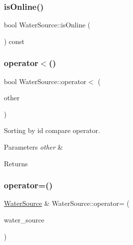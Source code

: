 \mbox{\label{classWaterSource_a130fd661ff31c53115cca23e4e2f210a}} 
\subsubsection{\texorpdfstring{is\+Online()}{isOnline()}}
{\footnotesize\ttfamily bool Water\+Source\+::is\+Online (\begin{DoxyParamCaption}{ }\end{DoxyParamCaption}) const}

\mbox{\label{classWaterSource_accb044cc78f9a444ca18bf7283b5b596}} 
\subsubsection{\texorpdfstring{operator$<$()}{operator<()}}
{\footnotesize\ttfamily bool Water\+Source\+::operator$<$ (\begin{DoxyParamCaption}\item[{const \mbox{\hyperlink{classWaterSource}{Water\+Source}} $\ast$}]{other }\end{DoxyParamCaption})}

Sorting by id compare operator. 
\begin{DoxyParams}{Parameters}
{\em other} & \\
\hline
\end{DoxyParams}
\begin{DoxyReturn}{Returns}

\end{DoxyReturn}
\mbox{\label{classWaterSource_aafdaafb023a35186ae01d213665b5e27}} 
\subsubsection{\texorpdfstring{operator=()}{operator=()}}
{\footnotesize\ttfamily \mbox{\hyperlink{classWaterSource}{Water\+Source}} \& Water\+Source\+::operator= (\begin{DoxyParamCaption}\item[{const \mbox{\hyperlink{classWaterSource}{Water\+Source}} \&}]{water\+\_\+source }\end{DoxyParamCaption})}

